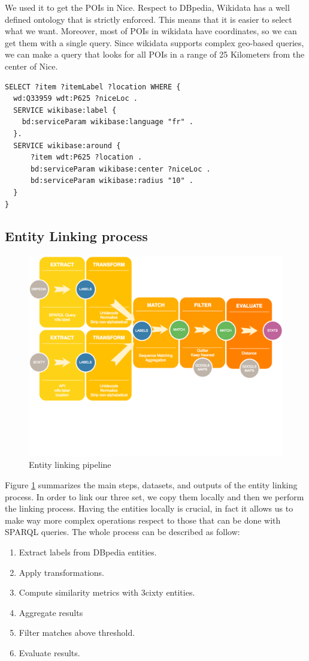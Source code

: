 \documentclass[paper=a4, fontsize=11pt]{scrartcl}
\begin{document}
We used it to get the POIs in Nice. Respect to DBpedia, Wikidata has a well defined ontology that is strictly enforced. This means that it is easier to select what we want. Moreover, most of POIs in wikidata have coordinates, so we can get them with a single query. Since wikidata supports complex geo-based queries, we can make a query that looks for all POIs in a range of 25 Kilometers from the center of Nice.
\begin{lstlisting}
SELECT ?item ?itemLabel ?location WHERE {
  wd:Q33959 wdt:P625 ?niceLoc .
  SERVICE wikibase:label {
    bd:serviceParam wikibase:language "fr" .
  }.
  SERVICE wikibase:around {
      ?item wdt:P625 ?location .
      bd:serviceParam wikibase:center ?niceLoc .
      bd:serviceParam wikibase:radius "10" .
  }
}
\end{lstlisting}

\subsection{Entity Linking process}

\begin{figure}[!htb]
  \centering
    \includegraphics[width=1\textwidth]{images/pipeline.png}
    \caption{Entity linking pipeline}
    \label{fig:pipeline}
\end{figure}


Figure \ref{fig:pipeline} summarizes the main steps, datasets, and outputs of the entity linking process.
In order to link our three set, we copy them locally and then we perform the linking process. Having the entities locally is crucial, in fact it allows us to make way more complex operations respect to those that can be done with SPARQL queries. The whole process can be described as follow:
\begin{enumerate}
\item Extract labels from DBpedia entities.
\item Apply transformations.
\item Compute similarity metrics with 3cixty entities.
\item Aggregate results
\item Filter matches above threshold.
\item Evaluate results.
\end{enumerate}
\end{document}
